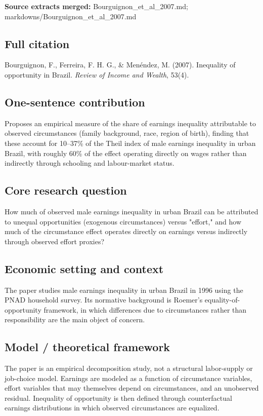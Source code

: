 \documentclass[11pt,a4paper]{article}
\begin{document}
\textbf{Source extracts merged:} Bourguignon\_et\_al\_2007.md; markdowns/Bourguignon\_et\_al\_2007.md

\subsection*{Full citation}
Bourguignon, F., Ferreira, F. H. G., \& Menéndez, M. (2007). Inequality of opportunity in Brazil. \textit{Review of Income and Wealth}, 53(4).

\subsection*{One-sentence contribution}
Proposes an empirical measure of the share of earnings inequality attributable to observed circumstances (family background, race, region of birth), finding that these account for 10--37\% of the Theil index of male earnings inequality in urban Brazil, with roughly 60\% of the effect operating directly on wages rather than indirectly through schooling and labour-market status.

\subsection*{Core research question}
How much of observed male earnings inequality in urban Brazil can be attributed to unequal opportunities (exogenous circumstances) versus "effort," and how much of the circumstance effect operates directly on earnings versus indirectly through observed effort proxies?

\subsection*{Economic setting and context}
The paper studies male earnings inequality in urban Brazil in 1996 using the PNAD household survey. Its normative background is Roemer’s equality-of-opportunity framework, in which differences due to circumstances rather than responsibility are the main object of concern.

\subsection*{Model / theoretical framework}
The paper is an empirical decomposition study, not a structural labor-supply or job-choice model. Earnings are modeled as a function of circumstance variables, effort variables that may themselves depend on circumstances, and an unobserved residual. Inequality of opportunity is then defined through counterfactual earnings distributions in which observed circumstances are equalized.
\end{document}

